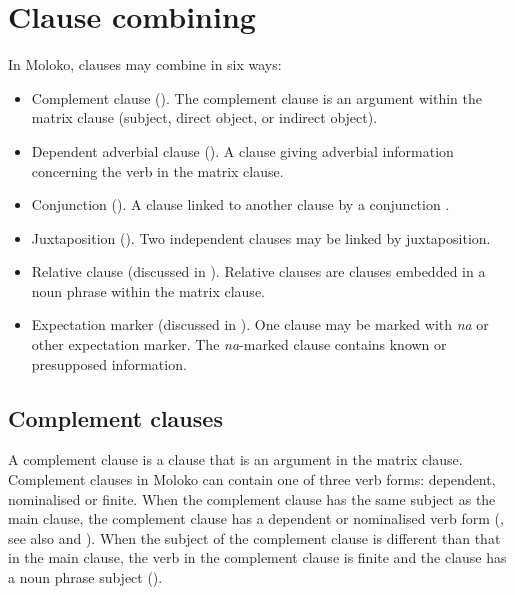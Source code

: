 \chapter[Clause combining]{Clause combining}\label{chap:12}
\hypertarget{RefHeading1213321525720847}{}
In Moloko, clauses may combine in six ways: 

\begin{itemize}
\item Complement clause (). The complement clause is an argument within the matrix clause (subject, direct object, or indirect object).
\item Dependent adverbial clause (). A clause giving adverbial information concerning the verb in the matrix clause. 
\item Conjunction (). A clause linked to another clause by a conjunction . 
\item Juxtaposition (). Two independent clauses may be linked by juxtaposition.
\item Relative clause (discussed in ). Relative clauses are clauses embedded in a noun phrase within the matrix clause. 
\item Expectation marker (discussed in ). One clause may be marked with \textit{na} or other expectation marker. The \textit{na}{}-marked clause contains known or presupposed information.
\end{itemize}

\section{Complement clauses}\label{sec:12.1}
\hypertarget{RefHeading1213341525720847}{}
A complement clause is a clause that is an argument in the matrix clause. Complement clauses in Moloko can contain one of three verb forms: dependent, nominalised or finite. When the complement clause has the same subject as the main clause, the complement clause has a dependent or nominalised verb form (, see also  and ). When the subject of the complement clause is different than that in the main clause, the verb in the complement clause is finite and the clause has a noun phrase subject (). 

